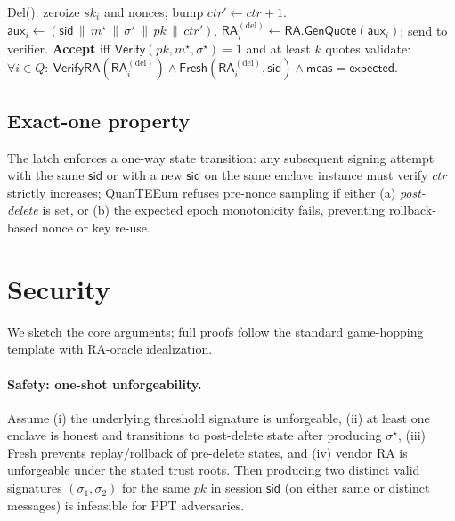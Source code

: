 \documentclass[runningheads,orivec]{llncs}
\newcommand{\prot}{\textsf{QuanTEEum}}
\newcommand{\sid}{\mathsf{sid}}
\newcommand{\RA}{\mathsf{RA}}
\begin{document}
\begin{algorithm}[!htbp]
\caption{\prot{}: \emph{DeleteAndVerify}}
\label{alg:delete-verify}
\begin{small}
\begin{algorithmic}[1]
  \State \textsf{Del}(): zeroize $sk_i$ and nonces; bump $ctr' \leftarrow ctr{+}1$.
  \State $\textsf{aux}_i \gets (\mathsf{sid}\,\|\,m^{\star}\,\|\,\sigma^{\star}\,\|\,pk\,\|\,ctr')$.
  \State $\RA_i^{(\mathrm{del})} \gets \textsf{RA.GenQuote}(\textsf{aux}_i)$; send to verifier.
\EndFor
\State \textbf{Accept} iff $\mathsf{Verify}(pk,m^{\star},\sigma^{\star})=1$ and at least $k$ quotes validate:
\State \hspace{1.2em}$\forall i\in Q:\ \textsf{VerifyRA}(\RA_i^{(\mathrm{del})})\wedge \textsf{Fresh}(\RA_i^{(\mathrm{del})},\mathsf{sid})\wedge \mathsf{meas}{=}\mathsf{expected}$.
\end{algorithmic}
\end{small}
\end{algorithm}

\subsection{Exact-one property}
The latch enforces a one-way state transition: any subsequent signing attempt with the same $\sid$ or with a new $\sid$ on the same enclave instance must verify $ctr$ strictly increases; \prot{} refuses pre-nonce sampling if either (a) \emph{post-delete} is set, or (b) the expected epoch monotonicity fails, preventing rollback-based nonce or key re-use.

\section{Security}\label{sec:security}
We sketch the core arguments; full proofs follow the standard game-hopping template with RA-oracle idealization.

\paragraph{Safety: one-shot unforgeability.}
\begin{theorem}\label{thm:one-shot}
Assume (i) the underlying threshold signature is unforgeable, (ii) at least one enclave is honest and transitions to post-delete state after producing $\sigma^{\star}$, (iii) \textsf{Fresh} prevents replay/rollback of pre-delete states, and (iv) vendor RA is unforgeable under the stated trust roots. Then producing two distinct valid signatures $(\sigma_1,\sigma_2)$ for the same $pk$ in session $\mathsf{sid}$ (on either same or distinct messages) is infeasible for PPT adversaries.
\end{theorem}
\end{document}
